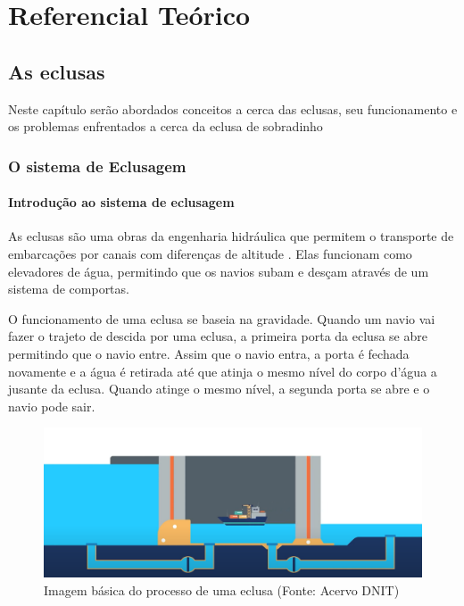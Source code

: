 \part{Referencial Teórico}

\chapter[As eclusas]{As eclusas}

Neste capítulo serão abordados conceitos a cerca das eclusas, seu funcionamento e os problemas enfrentados a cerca da eclusa de sobradinho

\section{O sistema de Eclusagem}

\subsection{Introdução ao sistema de eclusagem}

As eclusas são uma obras da engenharia hidráulica que permitem o transporte de embarcações por canais com diferenças de altitude \cite{locks_dams}. Elas funcionam como elevadores de água, permitindo que os navios subam e desçam através de um sistema de comportas.

O funcionamento de uma eclusa se baseia na gravidade. Quando um navio vai fazer o trajeto de descida por uma eclusa, a primeira porta da eclusa se abre permitindo que o navio entre. Assim que o navio entra, a porta é fechada novamente e a água é retirada até que atinja o mesmo nível do corpo d’água a jusante da eclusa. Quando atinge o mesmo nível, a segunda porta se abre e o navio pode sair.


\begin{figure}[h]
	\centering
	\label{fig:estr}
		\includegraphics[keepaspectratio=true,scale=0.5]{figuras/entrada_barco.png}
	\caption{Imagem básica do processo de uma eclusa (Fonte: Acervo DNIT)}
\end{figure}

